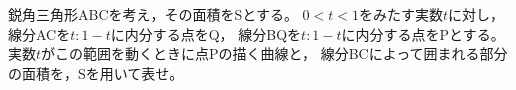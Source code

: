 \documentclass[../../main.tex]{subfiles}
\begin{document}
鋭角三角形ABCを考え，その面積をSとする。
$0<t<1$をみたす実数$t$に対し，線分ACを$t:1-t$に内分する点をQ，
線分BQを$t:1-t$に内分する点をPとする。
実数$t$がこの範囲を動くときに点Pの描く曲線と，
線分BCによって囲まれる部分の面積を，Sを用いて表せ。
\end{document}
